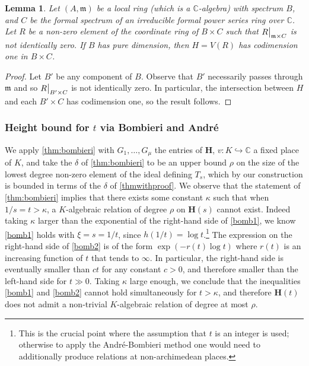 \documentclass[10pt]{article}
\numberwithin{equation}{section}
\theoremstyle{plain}
\newtheorem{lem}[thm]{Lemma}
\theoremstyle{definition}
\theoremstyle{remark}
\newcommand\restr[2]{{
	\left.\kern-\nulldelimiterspace
	#1
	\vphantom{\big|}
	\right|_{#2}
	}}
\newcommand{\C}{\mathbb{C}}
\begin{document}
\begin{lem}\label{lemmacodim}
    Let $(A,\mathfrak{m})$ be a local ring (which is a $\C$-algebra) with spectrum $B$, and $C$ be the formal spectrum of an irreducible formal power series ring over $\C$. Let $R$ be a non-zero element of the coordinate ring of $B\times C$ such that $\restr{R}{\mathfrak{m}\times C}$ is not identically zero. If $B$ has pure dimension, then $H=V(R)$ has codimension one in $B\times C$. 
\end{lem}

\begin{proof}
  Let $B'$ be any component of $B$. Observe that $B'$ necessarily passes through $\mathfrak{m}$ and so $\restr{R}{B'\times C}$ is not identically zero. In particular, the intersection between $H$ and each $B'\times C$ has codimension one, so the result follows.
\end{proof}






\subsubsection{Height bound for $t$ via Bombieri and Andr\'e}
\label{heightboundsec}

We apply \autoref{thm:bombieri} with $G_{1}, \hdots, G_{\mu}$ the entries of $\mathbf{H}$, $v : K \hookrightarrow \mathbb{C}$ a fixed place of $K$, and take the $\delta$ of \autoref{thm:bombieri} to be an upper bound $\rho$ on the size of the lowest degree non-zero element of the ideal defining $T_{s}$, which by our construction is bounded in terms of the $\delta$ of \autoref{thmwithproof}. We observe that the statement of \autoref{thm:bombieri} implies that there exists some constant $\kappa$ such that when $1/s = t > \kappa$, a $K$-algebraic relation of degree $\rho$ on $\mathbf{H}(s)$ cannot exist. Indeed taking $\kappa$ larger than the exponential of the right-hand side of \eqref{bomb1}, we know \eqref{bomb1} holds with $\xi = s = 1/t$, since $h(1/t) = \log t$.\footnote{This is the crucial point where the assumption that $t$ is an integer is used; otherwise to apply the Andr\'e-Bombieri method one would need to additionally produce relations at non-archimedean places.} The expression on the right-hand side of \eqref{bomb2} is of the form $\exp(- r(t) \log t)$ where $r(t)$ is an increasing function of $t$ that tends to $\infty$. In particular, the right-hand side is eventually smaller than $c t$ for any constant $c > 0$, and therefore smaller than the left-hand side for $t \gg 0$. Taking $\kappa$ large enough, we conclude that the inequalities \eqref{bomb1} and \eqref{bomb2} cannot hold simultaneously for $t > \kappa$, and therefore $\mathbf{H}(t)$ does not admit a non-trivial $K$-algebraic relation of degree at most $\rho$.
\end{document}
